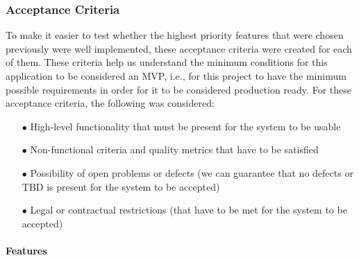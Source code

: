\subsubsection{Acceptance Criteria}

To make it easier to test whether the highest priority features that were chosen
previously were well implemented, these acceptance criteria were created for each
of them. These criteria help us understand the minimum conditions for this
application to be considered an MVP, i.e., for this project to have the minimum
possible requirements in order for it to be considered production ready.
\newline
For these acceptance criteria, the following was considered:

\begin{itemize}
    \item[$\bullet$] High-level functionality that must be present for the system to be usable
    \item[$\bullet$] Non-functional criteria and quality metrics that have to be satisfied
    \item[$\bullet$] Possibility of open problems or defects (we can guarantee that no defects or TBD is present for the system to be accepted)
    \item[$\bullet$] Legal or contractual restrictions (that have to be met for the system to be accepted)
\end{itemize}

\paragraph{Features}

